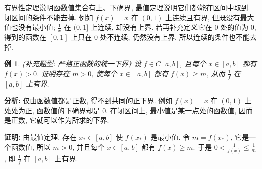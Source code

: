 \documentclass[UTF8,openany]{ctexbook}
\theoremstyle{chinesetextbook}
\newtheorem{example}{例}[section]
\newenvironment{cnproof}{\par\indent\textbf{证明:} \ignorespaces}{\par}
\begin{document}
有界性定理说明函数值集合有上、下确界, 最值定理说明它们都能在区间中取到. 闭区间的条件不能去掉. 例如 $f(x)=x$ 在 $(0,1)$ 上连续且有界, 但既没有最大值也没有最小值; $\displaystyle\frac1x$ 在 $(0,1]$ 上连续, 却没有上界. 若再补充定义它在 $0$ 处的值为 $0$, 得到的函数在 $[0,1]$ 上只在 $0$ 处不连续, 仍然没有上界, 所以连续的条件也不能去掉.
\begin{example}
\textnormal{(补充题型: 严格正函数的统一下界)} 设 $f\in C[a,b]$, 且每个 $x\in[a,b]$ 都有 $f(x)>0$. 证明存在 $m>0$, 使每个 $x\in[a,b]$ 都有 $f(x)\ge m$, 从而 $\displaystyle\frac1f$ 在 $[a,b]$ 上有界.
\end{example}
\par\indent\textbf{分析:} 仅由函数值都是正数, 得不到共同的正下界. 例如 $f(x)=x$ 在 $(0,1)$ 上处处为正, 函数值的下确界却是 $0$. 在闭区间上, 最小值是某一点处的函数值, 因而是正数, 它就可以作为所求的下界.
\begin{cnproof}
由最值定理, 存在 $x_*\in[a,b]$ 使 $f(x_*)$ 是最小值. 令 $m=f(x_*)$, 它是一个函数值, 所以 $m>0$, 并且每个 $x\in[a,b]$ 都有 $f(x)\ge m$. 于是 $\displaystyle0<\frac1{f(x)}\le\frac1m$, 即 $\displaystyle\frac1f$ 在 $[a,b]$ 上有界.
\end{cnproof}
\end{document}
